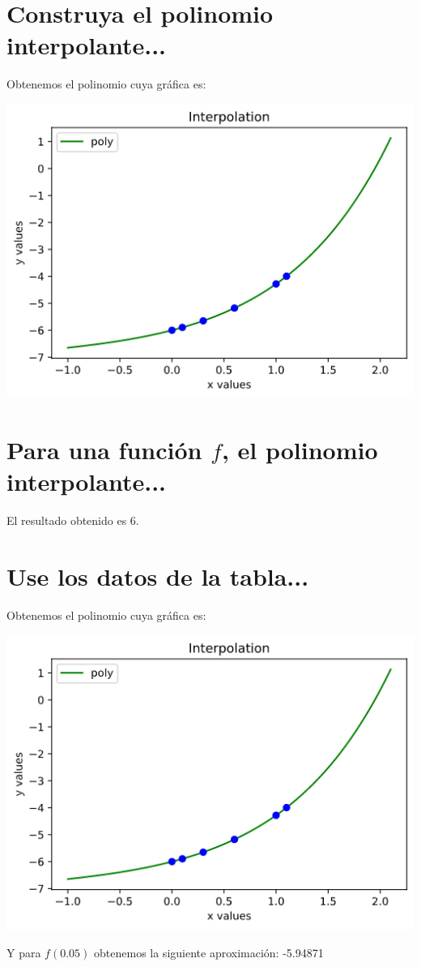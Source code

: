 \documentclass{article}
\begin{document}
\section{Construya el polinomio interpolante...}
Obtenemos el polinomio cuya gráfica es:
\begin{center}
    \includegraphics[scale=0.75]{grafica3.png}
\end{center}
\section{Para una función $f$, el polinomio interpolante...}
El resultado obtenido es 6.
\section{Use los datos de la tabla...}
Obtenemos el polinomio cuya gráfica es:
\begin{center}
    \includegraphics[scale=0.75]{grafica3.png}
\end{center}

Y para $f(0.05)$ obtenemos la siguiente aproximación: -5.94871
\end{document}
